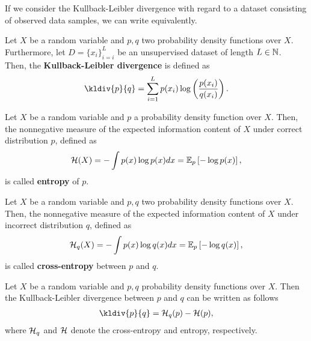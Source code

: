If we consider the Kullback-Leibler divergence with regard to a dataset consisting of observed data samples, we can write equivalently.

\begin{definition}
Let $X$ be a random variable and $p, q$ two probability density functions over $X$. Furthermore, let $D=\{x_i\}_{i=i}^L$ be an unsupervised dataset of length $L\in\operatorname{\mathbb{N}}$.\\
Then, the \textbf{Kullback-Leibler divergence} is defined as
\begin{align}
\kldiv{p}{q} = \sum_{i=1}^L p(x_i) \log \left( \frac{p(x_i)}{q(x_i)}\right).
\end{align}
\end{definition}

\begin{definition}\label{def_entropy}
Let $X$ be a random variable and $p$ a probability density function over $X$. Then, the nonnegative measure of the expected information content of $X$ under correct distribution $p$, defined as
\begin{align}
\mathcal{H}(X) = -\int p(x) \log p(x)dx = \operatorname{\mathbb{E}}_p \left[ - \log p(x) \right],
\end{align}
is called \textbf{entropy} of $p$.
\end{definition}


\begin{definition}\label{def_cross_entropy}
Let $X$ be a random variable and $p, q$ two probability density functions over $X$. Then, the nonnegative measure of the expected information content of $X$ under incorrect distribution $q$, defined as
\begin{align}
\mathcal{H}_q(X) = -\int p(x) \log q(x)dx = \operatorname{\mathbb{E}}_p \left[ - \log q(x) \right],
\end{align}
is called \textbf{cross-entropy} between $p$ and $q$.
\end{definition}


\begin{remark}
Let $X$ be a random variable and $p, q$ probability density functions over $X$. Then the Kullback-Leibler divergence between $p$ and $q$ can be written as follows
\begin{align*}
\kldiv{p}{q} = \H_q(p) - \H(p),
\end{align*}
where $\mathcal{H}_q$ and $\mathcal{H}$ denote the cross-entropy and entropy, respectively.
\end{remark}
